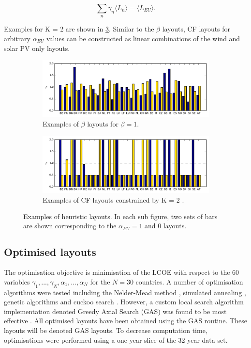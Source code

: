 \documentclass[a4paper, 5p, sort&compress]{elsarticle}%
\newcommand{\mean}[1]{\langle #1 \rangle}
\newcommand{\chromowidth}{1.00 \columnwidth}
\begin{document}
\begin{equation}
  \label{eq:5}
  \sum_{n} \gamma_{n} \mean{L_{n}} = \mean{L_{EU}}.
\end{equation}

Examples for K = 2 are shown in
\cref{fig:examples}. Similar to the $\beta$ layouts, CF layouts for
arbitrary $\alpha_{EU}$ values can be constructed as linear combinations of the
wind and solar PV only layouts.

\begin{figure}[t!]
  \centering
  \begin{subfigure}{2\columnwidth}
    \includegraphics[width = \chromowidth, center]{beta=1}
    \caption{Examples of $\beta$ layouts for $\beta = 1$.}
    \label{fig:betaExamples}
  \end{subfigure}
  \begin{subfigure}{2\columnwidth}
    \includegraphics[width = \chromowidth, center]{k=2cfMax}
    \caption{Examples of CF layouts constrained by K = 2 .}
    \label{fig:cfMaxExamples}
  \end{subfigure}
  \caption{Examples of heuristic layouts. In each sub figure, two sets
    of bars are shown corresponding to the $\alpha_{EU} = 1$ and $0$
    layouts.}
  \label{fig:examples}
\end{figure}

\subsection{Optimised layouts}
\label{sec:optimized-layouts}

The optimisation objective is minimisation of the LCOE with respect to
the 60 variables
$\gamma_{1}, ..., \gamma_{N}, \alpha_{1}, ..., \alpha_{N}$ for the $N=30$ countries.  A number of optimisation
algorithms were tested including the Nelder-Mead method \cite{nelder},
simulated annealing \cite{sa}, genetic algorithms \cite{ga} and cuckoo
search \cite{cs}. However, a custom local search algorithm
implementation denoted Greedy Axial Search (GAS) %
was found to be most effective \cite{emil}. All optimised layouts have
been obtained using the GAS routine. These layouts will be denoted GAS
layouts. To decrease computation time, optimisations were performed
using a one year slice of the 32 year data set.
\end{document}
